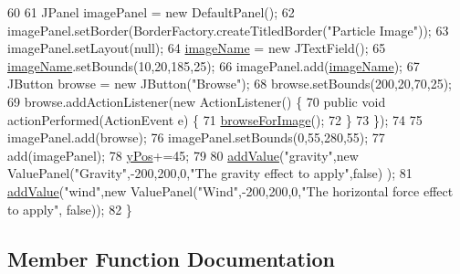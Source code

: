 \begin{DoxyCode}
60         
61         JPanel imagePanel = \textcolor{keyword}{new} DefaultPanel();
62         imagePanel.setBorder(BorderFactory.createTitledBorder(\textcolor{stringliteral}{"Particle Image"}));
63         imagePanel.setLayout(null);
64         \mbox{\hyperlink{classorg_1_1newdawn_1_1slick_1_1tools_1_1peditor_1_1_settings_panel_a4890547c09df436528a31f392cec73dd}{imageName}} = \textcolor{keyword}{new} JTextField();
65         \mbox{\hyperlink{classorg_1_1newdawn_1_1slick_1_1tools_1_1peditor_1_1_settings_panel_a4890547c09df436528a31f392cec73dd}{imageName}}.setBounds(10,20,185,25);
66         imagePanel.add(\mbox{\hyperlink{classorg_1_1newdawn_1_1slick_1_1tools_1_1peditor_1_1_settings_panel_a4890547c09df436528a31f392cec73dd}{imageName}});
67         JButton browse = \textcolor{keyword}{new} JButton(\textcolor{stringliteral}{"Browse"});
68         browse.setBounds(200,20,70,25);
69         browse.addActionListener(\textcolor{keyword}{new} ActionListener() \{
70             \textcolor{keyword}{public} \textcolor{keywordtype}{void} actionPerformed(ActionEvent e) \{
71                 \mbox{\hyperlink{classorg_1_1newdawn_1_1slick_1_1tools_1_1peditor_1_1_settings_panel_a2cf6675584c386d4feb59b6b39390724}{browseForImage}}();
72             \}
73         \});
74         
75         imagePanel.add(browse);
76         imagePanel.setBounds(0,55,280,55);
77         add(imagePanel);
78         \mbox{\hyperlink{classorg_1_1newdawn_1_1slick_1_1tools_1_1peditor_1_1_control_panel_a3d5996be7856b645ae7a1288ce688623}{yPos}}+=45;
79         
80         \mbox{\hyperlink{classorg_1_1newdawn_1_1slick_1_1tools_1_1peditor_1_1_control_panel_af298d1803e4450ed4ffe735500bb7c60}{addValue}}(\textcolor{stringliteral}{"gravity"},\textcolor{keyword}{new} ValuePanel(\textcolor{stringliteral}{"Gravity"},-200,200,0,\textcolor{stringliteral}{"The gravity effect to apply"},\textcolor{keyword}{false})
      );
81         \mbox{\hyperlink{classorg_1_1newdawn_1_1slick_1_1tools_1_1peditor_1_1_control_panel_af298d1803e4450ed4ffe735500bb7c60}{addValue}}(\textcolor{stringliteral}{"wind"},\textcolor{keyword}{new} ValuePanel(\textcolor{stringliteral}{"Wind"},-200,200,0,\textcolor{stringliteral}{"The horizontal force effect to apply"},\textcolor{keyword}{
      false}));
82     \}
\end{DoxyCode}


\subsection{Member Function Documentation}
\mbox{\label{classorg_1_1newdawn_1_1slick_1_1tools_1_1peditor_1_1_settings_panel_a2cf6675584c386d4feb59b6b39390724}} 
